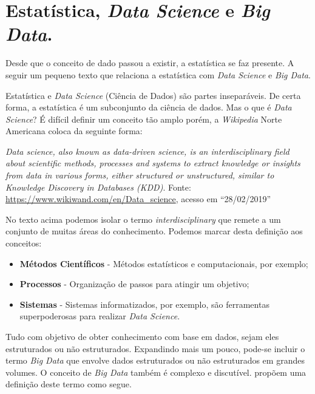 \documentclass[12pt,]{style/krantz}
\providecommand{\tightlist}{%
  \setlength{\itemsep}{0pt}\setlength{\parskip}{0pt}}
\renewenvironment{quote}{\begin{VF}}{\end{VF}}
\theoremstyle{definition}
\theoremstyle{definition}
\theoremstyle{definition}
\theoremstyle{remark}
\begin{document}
\hypertarget{estatistica-data-science-e-big-data.}{%
\section{\texorpdfstring{Estatística, \emph{Data Science} e \emph{Big Data}.}{Estatística, Data Science e Big Data.}}\label{estatistica-data-science-e-big-data.}}

Desde que o conceito de dado passou a existir, a estatística se faz presente. A seguir um pequeno texto que relaciona a estatística com \emph{Data Science} e \emph{Big Data}.

Estatística e \emph{Data Science} (Ciência de Dados) são partes inseparáveis. De certa forma, a estatística é um subconjunto da ciência de dados. Mas o que é \emph{Data Science}? É difícil definir um conceito tão amplo porém, a \emph{Wikipedia} Norte Americana coloca da seguinte forma:

\begin{quote}
\emph{Data science, also known as data-driven science, is an interdisciplinary field about scientific methods, processes and systems to extract knowledge or insights from data in various forms, either structured or unstructured, similar to Knowledge Discovery in Databases (KDD)}. Fonte: \url{https://www.wikiwand.com/en/Data_science}, acesso em ``28/02/2019''
\end{quote}

No texto acima podemos isolar o termo \emph{interdisciplinary} que remete a um conjunto de muitas áreas do conhecimento. Podemos marcar desta definição aos conceitos:

\begin{itemize}
\tightlist
\item
  \textbf{Métodos Científicos} - Métodos estatísticos e computacionais, por exemplo;
\item
  \textbf{Processos} - Organização de passos para atingir um objetivo;
\item
  \textbf{Sistemas} - Sistemas informatizados, por exemplo, são ferramentas superpoderosas para realizar \emph{Data Science}.
\end{itemize}

Tudo com objetivo de obter conhecimento com base em dados, sejam eles estruturados ou não estruturados. Expandindo mais um pouco, pode-se incluir o termo \emph{Big Data} que envolve dados estruturados ou não estruturados em grandes volumes. O conceito de \emph{Big Data} também é complexo e discutível. \citep{de2016formal} propõem uma definição deste termo como segue.
\end{document}

